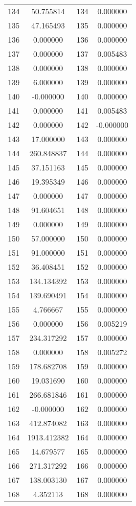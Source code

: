 \documentclass[12pt]{article}
\begin{document}
\begin{longtable}{@{}cccc@{}}
134 & 50.755814 & 134 & 0.000000 \\
135 & 47.165493 & 135 & 0.000000 \\
136 & 0.000000 & 136 & 0.000000 \\
137 & 0.000000 & 137 & 0.005483 \\
138 & 0.000000 & 138 & 0.000000 \\
139 & 6.000000 & 139 & 0.000000 \\
140 & -0.000000 & 140 & 0.000000 \\
141 & 0.000000 & 141 & 0.005483 \\
142 & 0.000000 & 142 & -0.000000 \\
143 & 17.000000 & 143 & 0.000000 \\
144 & 260.848837 & 144 & 0.000000 \\
145 & 37.151163 & 145 & 0.000000 \\
146 & 19.395349 & 146 & 0.000000 \\
147 & 0.000000 & 147 & 0.000000 \\
148 & 91.604651 & 148 & 0.000000 \\
149 & 0.000000 & 149 & 0.000000 \\
150 & 57.000000 & 150 & 0.000000 \\
151 & 91.000000 & 151 & 0.000000 \\
152 & 36.408451 & 152 & 0.000000 \\
153 & 134.134392 & 153 & 0.000000 \\
154 & 139.690491 & 154 & 0.000000 \\
155 & 4.766667 & 155 & 0.000000 \\
156 & 0.000000 & 156 & 0.005219 \\
157 & 234.317292 & 157 & 0.000000 \\
158 & 0.000000 & 158 & 0.005272 \\
159 & 178.682708 & 159 & 0.000000 \\
160 & 19.031690 & 160 & 0.000000 \\
161 & 266.681846 & 161 & 0.000000 \\
162 & -0.000000 & 162 & 0.000000 \\
163 & 412.874082 & 163 & 0.000000 \\
164 & 1913.412382 & 164 & 0.000000 \\
165 & 14.679577 & 165 & 0.000000 \\
166 & 271.317292 & 166 & 0.000000 \\
167 & 138.003130 & 167 & 0.000000 \\
168 & 4.352113 & 168 & 0.000000 \\

\end{longtable}
\end{document}
